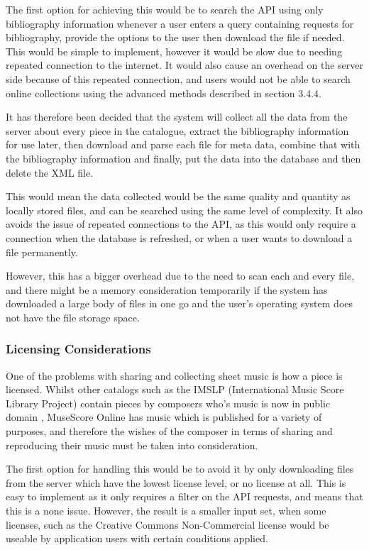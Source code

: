 The first option for achieving this would be to search the API using only bibliography information whenever a user enters a query containing requests for bibliography, provide the options to the user then download the file if needed. This would be simple to implement, however it would be slow due to needing repeated connection to the internet. It would also cause an overhead on the server side because of this repeated connection, and users would not be able to search online collections using the advanced methods described in section 3.4.4. 

It has therefore been decided that the system will collect all the data from the server about every piece in the catalogue, extract the bibliography information for use later, then download and parse each file for meta data, combine that with the bibliography information and finally, put the data into the database and then delete the XML file. 

This would mean the data collected would be the same quality and quantity as locally stored files, and can be searched using the same level of complexity. It also avoids the issue of repeated connections to the API, as this would only require a connection when the database is refreshed, or when a user wants to download a file permanently.

However, this has a bigger overhead due to the need to scan each and every file, and there might be a memory consideration temporarily if the system has downloaded a large body of files in one go and the user's operating system does not have the file storage space.

\subsubsection{Licensing Considerations}
One of the problems with sharing and collecting sheet music is how a piece is licensed. Whilst other catalogs such as the IMSLP (International Music Score Library Project) contain pieces by composers who's music is now in public domain \parencite{imslp}, MuseScore Online has music which is published for a variety of purposes, and therefore the wishes of the composer in terms of sharing and reproducing their music must be taken into consideration.

The first option for handling this would be to avoid it by only downloading files from the server which have the lowest license level, or no license at all. This is easy to implement as it only requires a filter on the API requests, and means that this is a none issue. However, the result is a smaller input set, when some licenses, such as the Creative Commons Non-Commercial license \parencite{cc-nc} would be useable by application users with certain conditions applied.

